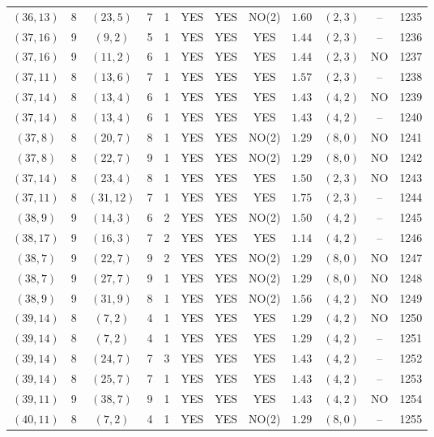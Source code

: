 \begin{longtable}{|c|c|c|c|c|c|c|c|c|c|c|c|}
$(36,13)$ & 8 & $(23,5)$ & 7 & 1 & YES & YES & NO(2) & $1.60$ & $(2,3)$ & -- & 1235\\
$(37,16)$ & 9 & $(9,2)$ & 5 & 1 & YES & YES & YES & $1.44$ & $(2,3)$ & -- & 1236\\
$(37,16)$ & 9 & $(11,2)$ & 6 & 1 & YES & YES & YES & $1.44$ & $(2,3)$ & NO & 1237\\
$(37,11)$ & 8 & $(13,6)$ & 7 & 1 & YES & YES & YES & $1.57$ & $(2,3)$ & -- & 1238\\
$(37,14)$ & 8 & $(13,4)$ & 6 & 1 & YES & YES & YES & $1.43$ & $(4,2)$ & NO & 1239\\
$(37,14)$ & 8 & $(13,4)$ & 6 & 1 & YES & YES & YES & $1.43$ & $(4,2)$ & -- & 1240\\
$(37,8)$ & 8 & $(20,7)$ & 8 & 1 & YES & YES & NO(2) & $1.29$ & $(8,0)$ & NO & 1241\\
$(37,8)$ & 8 & $(22,7)$ & 9 & 1 & YES & YES & NO(2) & $1.29$ & $(8,0)$ & NO & 1242\\
$(37,14)$ & 8 & $(23,4)$ & 8 & 1 & YES & YES & YES & $1.50$ & $(2,3)$ & NO & 1243\\
$(37,11)$ & 8 & $(31,12)$ & 7 & 1 & YES & YES & YES & $1.75$ & $(2,3)$ & -- & 1244\\
$(38,9)$ & 9 & $(14,3)$ & 6 & 2 & YES & YES & NO(2) & $1.50$ & $(4,2)$ & -- & 1245\\
$(38,17)$ & 9 & $(16,3)$ & 7 & 2 & YES & YES & YES & $1.14$ & $(4,2)$ & -- & 1246\\
$(38,7)$ & 9 & $(22,7)$ & 9 & 2 & YES & YES & NO(2) & $1.29$ & $(8,0)$ & NO & 1247\\
$(38,7)$ & 9 & $(27,7)$ & 9 & 1 & YES & YES & NO(2) & $1.29$ & $(8,0)$ & NO & 1248\\
$(38,9)$ & 9 & $(31,9)$ & 8 & 1 & YES & YES & NO(2) & $1.56$ & $(4,2)$ & NO & 1249\\
$(39,14)$ & 8 & $(7,2)$ & 4 & 1 & YES & YES & YES & $1.29$ & $(4,2)$ & NO & 1250\\
$(39,14)$ & 8 & $(7,2)$ & 4 & 1 & YES & YES & YES & $1.29$ & $(4,2)$ & -- & 1251\\
$(39,14)$ & 8 & $(24,7)$ & 7 & 3 & YES & YES & YES & $1.43$ & $(4,2)$ & -- & 1252\\
$(39,14)$ & 8 & $(25,7)$ & 7 & 1 & YES & YES & YES & $1.43$ & $(4,2)$ & -- & 1253\\
$(39,11)$ & 9 & $(38,7)$ & 9 & 1 & YES & YES & YES & $1.43$ & $(4,2)$ & NO & 1254\\
$(40,11)$ & 8 & $(7,2)$ & 4 & 1 & YES & YES & NO(2) & $1.29$ & $(8,0)$ & -- & 1255\\

\end{longtable}
